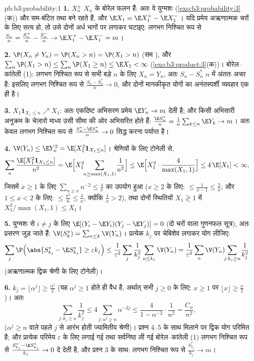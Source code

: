 \begin{solution}{pb:b3:probability:1}
\textbf{1.} $X_n^{\pm}$ $X_n$ के बोरेल फलन हैं: अतः वे
युग्मशः 
(\cref{exo:b3:probability:3}(क)) और सम-बंटित तथा 
बने रहते हैं, और $\E X_1 = \E X_1^+ - \E
X_1^-$। यदि प्रमेय अऋणात्मक चरों के लिए सत्य हो, तो उसे दोनों
अर्ध भागों पर लगाकर घटाइए:
लगभग निश्चित रूप से $\frac{S_n}n = \frac{S_n^+}n -
\frac{S_n^-}n \to \E X_1^+ - \E X_1^- = m$।

\textbf{2.} $\P(X_n \neq Y_n) = \P(X_n > n) = \P(X_1 > n)$
(सम ), और $\sum_n\P(X_1 > n) \leq \sum_n\P(X_1
\geq n) \leq \E X_1 < \infty$
(\cref{exo:b3:product:3}(क))। बोरेल--कांतेली (1): लगभग
निश्चित रूप से सभी बड़े $n$ के लिए $X_n = Y_n$, अतः $S_n -
S_n^*$ $n$ में अंततः अचर है: इसलिए लगभग निश्चित रूप से
$\frac{S_n - S_n^*}n \to 0$, और दोनों मानकीकृत योगों का
अनंतस्पर्शी व्यवहार एक ही है।

\textbf{3.} $X_1\mathbf 1_{X_1 \leq n} \nearrow X_1$: अतः
एकदिष्ट अभिसरण प्रमेय $\E Y_n \to m$ देती है; और किसी
अभिसारी अनुक्रम के चेज़ारो माध्य उसी सीमा की ओर अभिसरित होते
हैं: $\frac{\E S_n^*}n =
\frac1n\sum_{k\leq n}\E Y_k \to m$। अतः केवल लगभग निश्चित
रूप से $\frac{S^*_n - \E S^*_n}{n} \to 0$ सिद्ध करना पर्याप्त
है।

\textbf{4.} $\V(Y_n) \leq \E Y_n^2 = \E[X_1^2\mathbf
1_{X_1\leq n}]$। श्रेणियों के लिए टोनेली से,
\[
\sum_n\frac{\E[X_1^2\mathbf 1_{X_1\leq n}]}{n^2}
= \E\Bigl[X_1^2\!\!\sum_{n \geq \max(X_1, 1)}\!\frac1{n^2}
\Bigr]
\leq \E\Bigl[X_1^2\cdot\frac{4}{\max(X_1,1)}\Bigr]
\leq 4\,\E[X_1] < \infty,
\]
जिसमें $x \geq 1$ के लिए $\sum_{n\geq x}n^{-2} \leq \frac4x$
का उपयोग हुआ ($x \geq 2$ के लिए: $\leq \frac1{x-1} \leq
\frac2x$; और $1
\leq x < 2$ के लिए: $\leq \frac{\pi^2}6 \leq \frac4x$,
क्योंकि $\frac4x > 2$), तथा दोनों स्थितियों $X_1 \gtrless 1$
में $X_1^2/\max(X_1, 1) \leq X_1$।

\textbf{5.} युग्मशः  से $i \neq j$ के लिए
$\E[(Y_i - \E
Y_i)(Y_j - \E Y_j)] = 0$ (दो चरों वाला गुणनफल सूत्र), अतः
प्रसरण जुड़ जाते हैं: $\V(S^*_k) =
\sum_{n\leq k}\V(Y_n)$। प्रत्येक $k_j$ पर चेबिशेव लगाकर योग
लीजिए:
\[
\sum_j\P\Bigl(\abs{S^*_{k_j} - \E S^*_{k_j}} \geq
\varepsilon k_j\Bigr)
\leq \frac1{\varepsilon^2}\sum_j\frac1{k_j^2}\sum_{n\leq
k_j}\V(Y_n)
= \frac1{\varepsilon^2}\sum_n\V(Y_n)\!\!\sum_{j : k_j\geq
n}\!\frac1{k_j^2}
\]
(अऋणात्मक द्विक श्रेणी के लिए टोनेली)।

\textbf{6.} $k_j = \lfloor\alpha^j\rfloor \geq
\frac{\alpha^j}2$ (यह $\alpha^j \geq 1$ होते ही वैध है,
अर्थात् सभी $j \geq 0$ के लिए: $x \geq 1$ पर $\lfloor
x\rfloor \geq \frac x2$)। अतः
\[
\sum_{j : k_j \geq n}\frac1{k_j^2}
\leq 4\sum_{j : \alpha^j \geq n}\alpha^{-2j}
\leq \frac{4}{1 - \alpha^{-2}}\cdot\frac1{n^2}
= \frac{C_\alpha}{n^2},
\]
($\alpha^j \geq n$ वाले पहले $j$ से आरंभ होती ज्यामितीय
श्रेणी)। प्रश्न 4--5 के साथ मिलाने पर द्विक योग परिमित है;
और प्रत्येक परिमेय $\varepsilon$ के लिए लगाई गई तथा
सर्वनिष्ठ ली गई बोरेल--कांतेली (1) लगभग निश्चित रूप से
$\frac{S^*_{k_j} - \E S^*_{k_j}}{k_j} \to 0$ दे देती है, और
प्रश्न 3 के साथ: लगभग निश्चित रूप से
$\frac{S^*_{k_j}}{k_j} \to m$।


\end{solution}
